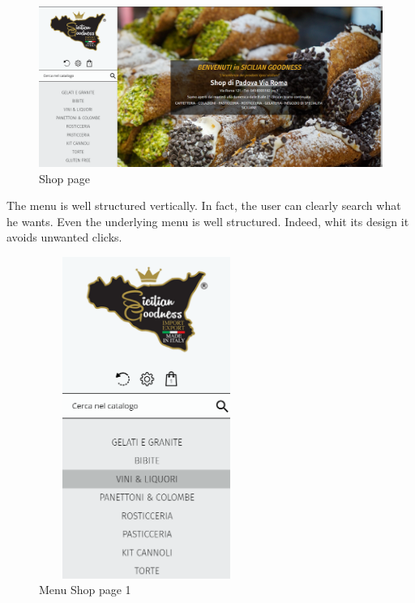 \begin{figure}[H]
	\centering\includegraphics[width=12cm]{Img/Shop.png}
	\caption{Shop page}
\end{figure}

The menu is well structured vertically. In fact, the user can clearly search what he wants. 
Even the underlying menu is well structured. Indeed, whit its design it avoids unwanted clicks.

\begin{figure}[H]
	\centering\includegraphics[height=10.5cm, width=7cm]{Img/menushop1.png}
	\caption{Menu Shop page 1}
\end{figure}

